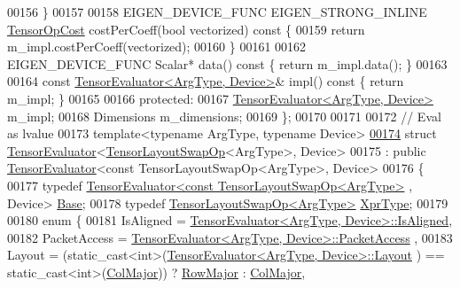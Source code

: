 \begin{DoxyCode}
00156   \}
00157 
00158   EIGEN\_DEVICE\_FUNC EIGEN\_STRONG\_INLINE \hyperlink{class_eigen_1_1_tensor_op_cost}{TensorOpCost} costPerCoeff(\textcolor{keywordtype}{bool} vectorized)\textcolor{keyword}{ const }\{
00159     \textcolor{keywordflow}{return} m\_impl.costPerCoeff(vectorized);
00160   \}
00161 
00162   EIGEN\_DEVICE\_FUNC Scalar* data()\textcolor{keyword}{ const }\{ \textcolor{keywordflow}{return} m\_impl.data(); \}
00163 
00164   \textcolor{keyword}{const} \hyperlink{struct_eigen_1_1_tensor_evaluator}{TensorEvaluator<ArgType, Device>}& impl()\textcolor{keyword}{ const }\{ \textcolor{keywordflow}{return} m\_impl; \}
00165 
00166  \textcolor{keyword}{protected}:
00167   \hyperlink{struct_eigen_1_1_tensor_evaluator}{TensorEvaluator<ArgType, Device>} m\_impl;
00168   Dimensions m\_dimensions;
00169 \};
00170 
00171 
00172 \textcolor{comment}{// Eval as lvalue}
00173 \textcolor{keyword}{template}<\textcolor{keyword}{typename} ArgType, \textcolor{keyword}{typename} Device>
\hyperlink{struct_eigen_1_1_tensor_evaluator_3_01_tensor_layout_swap_op_3_01_arg_type_01_4_00_01_device_01_4}{00174}   \textcolor{keyword}{struct }\hyperlink{struct_eigen_1_1_tensor_evaluator}{TensorEvaluator}<\hyperlink{class_eigen_1_1_tensor_layout_swap_op}{TensorLayoutSwapOp}<ArgType>, Device>
00175   : \textcolor{keyword}{public} \hyperlink{struct_eigen_1_1_tensor_evaluator}{TensorEvaluator}<const TensorLayoutSwapOp<ArgType>, Device>
00176 \{
00177   \textcolor{keyword}{typedef} \hyperlink{struct_eigen_1_1_tensor_evaluator}{TensorEvaluator<const TensorLayoutSwapOp<ArgType>}
      , Device> \hyperlink{struct_eigen_1_1_tensor_evaluator_3_01const_01_tensor_layout_swap_op_3_01_arg_type_01_4_00_01_device_01_4}{Base};
00178   \textcolor{keyword}{typedef} \hyperlink{class_eigen_1_1_tensor_layout_swap_op}{TensorLayoutSwapOp<ArgType>} \hyperlink{class_eigen_1_1_tensor_layout_swap_op}{XprType};
00179 
00180   \textcolor{keyword}{enum} \{
00181     IsAligned = \hyperlink{struct_eigen_1_1_tensor_evaluator}{TensorEvaluator<ArgType, Device>::IsAligned},
00182     PacketAccess = \hyperlink{struct_eigen_1_1_tensor_evaluator}{TensorEvaluator<ArgType, Device>::PacketAccess}
      ,
00183     Layout = (\textcolor{keyword}{static\_cast<}\textcolor{keywordtype}{int}\textcolor{keyword}{>}(\hyperlink{struct_eigen_1_1_tensor_evaluator}{TensorEvaluator<ArgType, Device>::Layout}
      ) == static\_cast<int>(\hyperlink{group__enums_ggaacded1a18ae58b0f554751f6cdf9eb13a0cbd4bdd0abcfc0224c5fcb5e4f6669a}{ColMajor})) ? \hyperlink{group__enums_ggaacded1a18ae58b0f554751f6cdf9eb13acfcde9cd8677c5f7caf6bd603666aae3}{RowMajor} : \hyperlink{group__enums_ggaacded1a18ae58b0f554751f6cdf9eb13a0cbd4bdd0abcfc0224c5fcb5e4f6669a}{ColMajor},

\end{DoxyCode}

